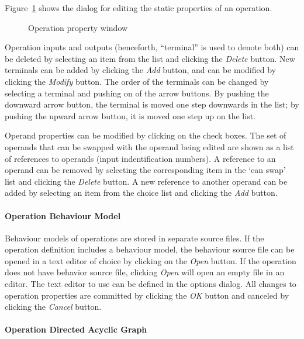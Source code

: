\documentclass[twoside]{tceusermanual}
\begin{document}
Figure~\ref{fig:osed_operation_window} shows the dialog for editing the
static properties of an operation. 
 
\begin{figure}[tb]
\centerline{}
\caption{Operation property window}
\label{fig:osed_operation_window}
\end{figure}

Operation inputs and outputs (henceforth, ``terminal'' is used to denote both)
can be deleted by selecting an item from the list and clicking the \emph{Delete}
button. New terminals can be added
by clicking the \emph{Add} button, and can be modified by clicking the \emph{Modify}
button. The order of the terminals can be changed by selecting a terminal
and pushing on of the arrow buttons. By pushing the downward arrow button, the
terminal is moved one step downwards in the list; by pushing the upward arrow
button, it is moved one step up on the list.

Operand properties can be modified by clicking on the check boxes. The set
of operands that can be swapped with the operand being edited are shown as a
list of references to operands (input indentification numbers).  A reference
to an operand can be removed by selecting the corresponding item in the `can
swap' list and clicking the \emph{Delete} button.  A new reference to another
operand can be added by selecting an item from the choice list and clicking
the \emph{Add} button.

\paragraph{Operation Behaviour Model}

Behaviour models of operations are stored in separate source files.  If the
operation definition includes a behaviour model, the behaviour source file
can be opened in a text editor of choice by clicking on the \emph{Open}
button. If the operation does not have behavior source file, clicking
\emph{Open} will open an empty file in an editor. The text editor to use can
be defined in the options dialog. All changes to operation properties are 
committed by clicking the \emph{OK} button and canceled by clicking the \emph{Cancel} 
button.

\paragraph{Operation Directed Acyclic Graph}
\end{document}
